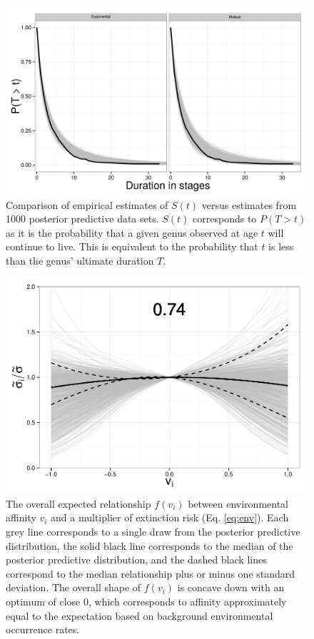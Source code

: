 \documentclass{article}
\begin{document}
\begin{figure}[ht]
  \centering
  \includegraphics[height = 0.5\textheight,width=\textwidth,keepaspectratio=true]{figure/survival_curves}
  \caption{Comparison of empirical estimates of \(S(t)\) versus estimates from 1000 posterior predictive data sets. \(S(t)\) corresponds to \(P(T > t)\) as it is the probability that a given genus observed at age \(t\) will continue to live. This is equivalent to the probability that \(t\) is less than the genus' ultimate duration \(T\).}
  \label{fig:surv}
\end{figure}

\begin{figure}[ht]
  \centering
  \includegraphics[height = 0.5\textheight,width=\textwidth,keepaspectratio=true]{figure/environ_quad}
  \caption{The overall expected relationship \(f(v_{i})\) between environmental affinity \(v_{i}\) and a multiplier of extinction risk (Eq. \ref{eq:env}). Each grey line corresponds to a single draw from the posterior predictive distribution, the solid black line corresponds to the median of the posterior predictive distribution, and the dashed black lines correspond to the median relationship plus or minus one standard deviation. The overall shape of \(f(v_{i})\) is concave down with an optimum of close 0, which corresponds to affinity approximately equal to the expectation based on background environmental occurrence rates.}
  \label{fig:env_mean}
\end{figure}
\end{document}
